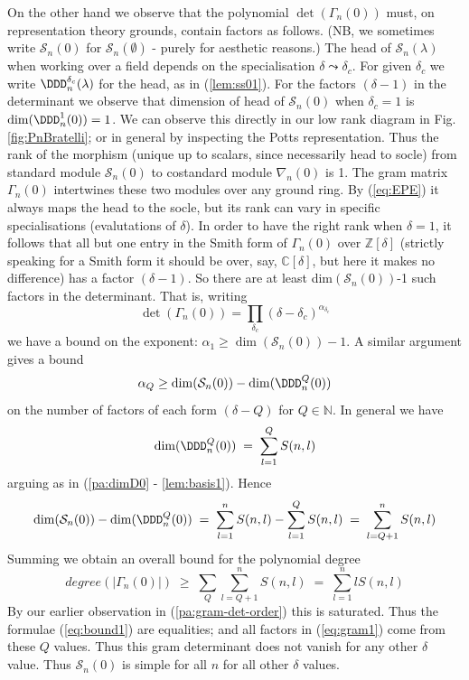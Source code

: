\documentclass[reqno,10pt,a4paper]{amsart}
\newcommand{\C}{\mathbb{C}}
\newcommand{\N}{\mathbb{N}}
\newcommand{\Z}{\mathbb{Z}}
\newcommand{\beq}{\begin{equation}}
\newcommand{\eq}{\end{equation}}
\newcommand{\red}[1]{\textcolor{red}{#1}}
\newcommand{\ppm}[1]{\red{#1}}
\newcommand{\cell}{\mathcal{S}}
\newcommand{\SSS}{\mathcal{S}} %
\newcommand{\Gram}{\Gamma}
\begin{document}
\mdef  \label{pa:simpleS0}
On the other hand we observe that the polynomial 
$\det(\Gram_n(0))$
must,
on representation theory grounds, 
contain factors as follows. 
(NB, we sometimes write $\SSS_n(0)$ for $\SSS_n(\emptyset)$ - purely for aesthetic reasons.)
The head of $\SSS_n(\lambda)$ 
when working over a field
depends on the specialisation $\delta\leadsto\delta_c$. For given $\delta_c$ we write $\DDD_n^{\delta_c}(\lambda)$ for the head,
as in (\ref{lem:ss01}).
For the factors $(\delta -1)$ in the determinant we observe that 
dimension of head of $\SSS_n(0)$ 
when $\delta_c =1$
is  $\dim(\DDD_n^{1}(0)) = 1$. 
We can observe this directly in our low rank 
diagram in Fig.\ref{fig:PnBratelli};
or in general by inspecting the Potts representation.
Thus the rank of the 
morphism (unique up to scalars, since necessarily head to socle) from 
standard module $\SSS_n(0)$ to 
costandard module $\nabla_n(0)$   %
is 1. 
The gram matrix $\Gram_n(0)$ intertwines these two modules over any ground ring.
By (\ref{eq:EPE}) it
always maps the head to the socle, %
but its rank can
vary in specific specialisations (evalutations of $\delta$).
In order to have the right rank when $\delta=1$, 
it follows that all but one entry in the Smith form 
of $\Gram_n(0)$ over $\Z[\delta]$ (strictly speaking for a Smith form it should be over, say,
$\C[\delta]$, but here it makes no difference)
has a factor $(\delta -1)$.
So there are at least dim$(\SSS_n(0))$-1 such factors
in the determinant. 
That is, writing 
\beq  \label{eq:gram1} 
\det(\Gram_n(0)) = \prod_{\delta_c} (\delta-\delta_c)^{\alpha_{\delta_c}} 
\eq 
we have 
a bound on the exponent:
$\alpha_1 \geq \dim(\SSS_n(0))-1$.
A similar argument gives a bound 
\beq \label{eq:bound1}
\alpha_Q \geq \dim(\SSS_n(0))-\dim(\DDD_n^Q(0))
\eq 
on the number of
factors of each form $(\delta-Q)$ for $Q \in \N$. 
In general we have
\beq   \label{eq:dimD1} 
\dim(\DDD_n^Q(0))  \;=\; 
 \sum_{l=1}^{Q} S(n,l)
\eq 
arguing as in (\ref{pa:dimD0} - \ref{lem:basis1}). 
Hence
\[
\dim(\SSS_n(0))-\dim(\DDD_n^Q(0))  \;=\; 
\sum_{l=1}^n S(n,l) - \sum_{l=1}^{Q} S(n,l)
\; = \; \sum_{l=Q+1}^{n} S(n,l)
\]
Summing we obtain an overall bound for the polynomial degree
\[
degree(|\Gram_n (0) | )    \; \geq \; 
\sum_Q \sum_{l=Q+1}^{n} S(n,l) 
\; = \; \sum_{l=1}^n l S(n,l)
\]
By 
our earlier observation in (\ref{pa:gram-det-order})
this is saturated.
Thus the formulae (\ref{eq:bound1}) are equalities; and 
all factors in (\ref{eq:gram1}) come from 
these $Q$ values. Thus this gram determinant does not vanish for any other $\delta$ value. 
Thus $\SSS_n(0)$ is simple for all $n$ for all other $\delta$ values. 
\end{document}
